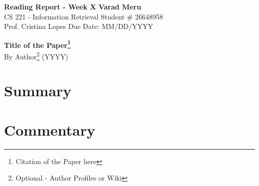 \documentclass[a4paper, 11pt]{article}
\begin{document}
\begin{noindent}
\large\textbf{Reading Report - Week X} \hfill \textbf{Varad Meru} \\
\normalsize CS 221 - Information Retrieval \hfill Student \# 26648958 \\
Prof. Cristina Lopes \hfill Due Date: MM/DD/YYYY
\end{noindent}
\noindent\makebox[\linewidth]{\rule{\textwidth}{0.4pt}}

\begin{center}
\textbf{\Large{Title of the Paper}\footnote{Citation of the Paper here}}\\
By {Author}\footnote{Optional - Author Profiles or Wiki} (YYYY)
\end{center}
\vspace{-25pt}
\section*{Summary}
\vspace{-5pt}
\lipsum[1]
\lipsum[2]
\lipsum[3]
\lipsum[4]


\vspace{-10pt}
\section*{Commentary}
\vspace{-5pt}
\lipsum[5]
\lipsum[6]
\end{document}
